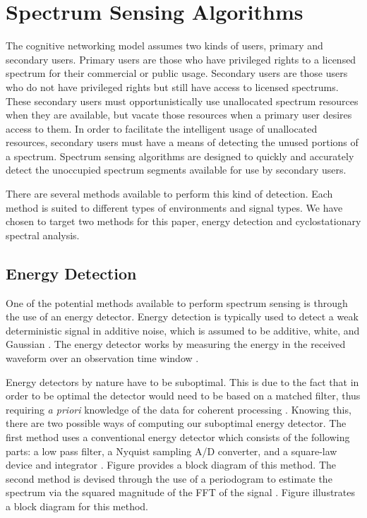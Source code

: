 \section{Spectrum Sensing Algorithms}
The cognitive networking model assumes two kinds of users, primary and secondary users.  Primary users are those who have privileged rights to a licensed spectrum for their commercial or public usage.  Secondary users are those users who do not have privileged rights but still have access to licensed spectrums.  These secondary users must opportunistically use unallocated spectrum resources when they are available, but vacate those resources when a primary user desires access to them.  In order to facilitate the intelligent usage of unallocated resources, secondary users must have a means of detecting the unused portions of a spectrum.  Spectrum sensing algorithms are designed to quickly and accurately detect the unoccupied spectrum segments available for use by secondary users.

There are several methods available to perform this kind of detection.  Each method is suited to different types of environments and signal types.  We have chosen to target two methods for this paper, energy detection and cyclostationary spectral analysis.

\subsection{Energy Detection}
\label{sect:energy_detect}
One of the potential methods available to perform spectrum sensing is through the use of an energy detector.  Energy detection is typically used to detect a weak deterministic signal in additive noise, which is assumed to be additive, white, and Gaussian \cite{CabTkaBro06}.  The energy detector works by measuring the energy in the received waveform over an observation time window \cite{CabTkaBro06}.

Energy detectors by nature have to be suboptimal.  This is due to the fact that in order to be optimal the detector would need to be based on a matched filter, thus requiring \textit{a priori} knowledge of the data for coherent processing \cite{CabTkaBro06}.  Knowing this, there are two possible ways of computing our suboptimal energy detector.  The first method uses a conventional energy detector which consists of the following parts: a low pass filter, a Nyquist sampling A/D converter, and a square-law device and integrator \cite{CabTkaBro06}.  Figure  provides a block diagram of this method.  The second method is devised through the use of a periodogram to estimate the spectrum via the squared magnitude of the FFT of the signal \cite{CabTkaBro06}.  Figure  illustrates a block diagram for this method.

